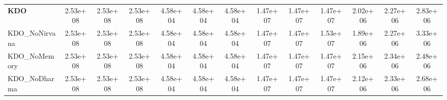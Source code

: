 \begin{table}
\begin{tabular}{lcccccccccccc}
\textbf{KDO} & 2.53e+08 & 2.53e+08 & 2.53e+08 & 4.58e+04 & 4.58e+04 & 4.58e+04 & 1.47e+07 & 1.47e+07 & 1.47e+07 & 2.02e+06 & 2.27e+06 & 2.83e+06 \\
KDO_NoNirvana & 2.53e+08 & 2.53e+08 & 2.53e+08 & 4.58e+04 & 4.58e+04 & 4.58e+04 & 1.47e+07 & 1.47e+07 & 1.53e+07 & 1.89e+06 & 2.27e+06 & 3.33e+06 \\
KDO_NoMemory & 2.53e+08 & 2.53e+08 & 2.53e+08 & 4.58e+04 & 4.58e+04 & 4.58e+04 & 1.47e+07 & 1.47e+07 & 1.47e+07 & 2.15e+06 & 2.34e+06 & 2.48e+06 \\
KDO_NoDharma & 2.53e+08 & 2.53e+08 & 2.53e+08 & 4.58e+04 & 4.58e+04 & 4.58e+04 & 1.47e+07 & 1.47e+07 & 1.47e+07 & 2.12e+06 & 2.33e+06 & 2.68e+06 \\
\bottomrule
\end{tabular}
\end{table}
